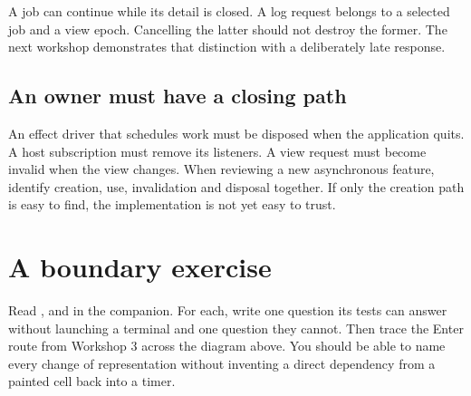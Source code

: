 A job can continue while its detail is closed. A log request belongs to a selected job and a view epoch. Cancelling the latter should not destroy the former. The next workshop demonstrates that distinction with a deliberately late response.

\subsection{An owner must have a closing path}

An effect driver that schedules work must be disposed when the application quits. A host subscription must remove its listeners. A view request must become invalid when the view changes. When reviewing a new asynchronous feature, identify creation, use, invalidation and disposal together. If only the creation path is easy to find, the implementation is not yet easy to trust.

\section{A boundary exercise}

Read ,  and  in the companion. For each, write one question its tests can answer without launching a terminal and one question they cannot. Then trace the Enter route from Workshop 3 across the diagram above. You should be able to name every change of representation without inventing a direct dependency from a painted cell back into a timer.
